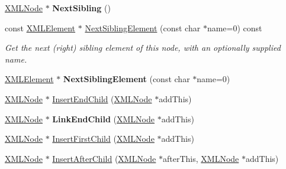 \begin{DoxyCompactItemize}
\hyperlink{classCPlantBox_1_1tinyxml2_1_1XMLNode}{X\+M\+L\+Node} $\ast$ {\bfseries Next\+Sibling} ()
\item 
\mbox{\label{classCPlantBox_1_1tinyxml2_1_1XMLNode_a210a740b8d54051724274f58d8fbe258}} 
const \hyperlink{classCPlantBox_1_1tinyxml2_1_1XMLElement}{X\+M\+L\+Element} $\ast$ \hyperlink{classCPlantBox_1_1tinyxml2_1_1XMLNode_a210a740b8d54051724274f58d8fbe258}{Next\+Sibling\+Element} (const char $\ast$name=0) const
\begin{DoxyCompactList}\small\item\em Get the next (right) sibling element of this node, with an optionally supplied name. \end{DoxyCompactList}\item 
\mbox{\label{classCPlantBox_1_1tinyxml2_1_1XMLNode_aafd11c6fab7ef3d1cf7234b6bb735824}} 
\hyperlink{classCPlantBox_1_1tinyxml2_1_1XMLElement}{X\+M\+L\+Element} $\ast$ {\bfseries Next\+Sibling\+Element} (const char $\ast$name=0)
\item 
\hyperlink{classCPlantBox_1_1tinyxml2_1_1XMLNode}{X\+M\+L\+Node} $\ast$ \hyperlink{classCPlantBox_1_1tinyxml2_1_1XMLNode_a5601da67d3f1cead3ac5b6018cee22e9}{Insert\+End\+Child} (\hyperlink{classCPlantBox_1_1tinyxml2_1_1XMLNode}{X\+M\+L\+Node} $\ast$add\+This)
\item 
\mbox{\label{classCPlantBox_1_1tinyxml2_1_1XMLNode_a9e9fbbe1a2b10ec1b47ea21d8518ffde}} 
\hyperlink{classCPlantBox_1_1tinyxml2_1_1XMLNode}{X\+M\+L\+Node} $\ast$ {\bfseries Link\+End\+Child} (\hyperlink{classCPlantBox_1_1tinyxml2_1_1XMLNode}{X\+M\+L\+Node} $\ast$add\+This)
\item 
\hyperlink{classCPlantBox_1_1tinyxml2_1_1XMLNode}{X\+M\+L\+Node} $\ast$ \hyperlink{classCPlantBox_1_1tinyxml2_1_1XMLNode_af88f5f593246fd9d78eedfe2fbebe7b4}{Insert\+First\+Child} (\hyperlink{classCPlantBox_1_1tinyxml2_1_1XMLNode}{X\+M\+L\+Node} $\ast$add\+This)
\item 
\hyperlink{classCPlantBox_1_1tinyxml2_1_1XMLNode}{X\+M\+L\+Node} $\ast$ \hyperlink{classCPlantBox_1_1tinyxml2_1_1XMLNode_a6cc9b466c5dd967e36b35dc809a2fc12}{Insert\+After\+Child} (\hyperlink{classCPlantBox_1_1tinyxml2_1_1XMLNode}{X\+M\+L\+Node} $\ast$after\+This, \hyperlink{classCPlantBox_1_1tinyxml2_1_1XMLNode}{X\+M\+L\+Node} $\ast$add\+This)
\item 

\end{DoxyCompactItemize}
